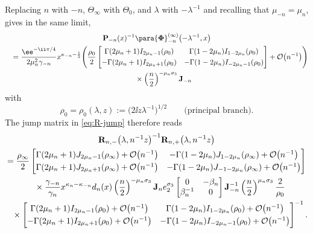 Replacing $n$ with $-n$, $\Theta_\infty$ with $\Theta_0$, and $\lambda$ with $-\lambda^{-1}$ and recalling that $\mu_{-n} = \mu_n$, gives in the same limit,
\begin{gather*}
 \mathbf{P}_{-n}(x)^{-1}\para{\mathbf{\Phi}}_{-n}^{(\infty)}\bigl(-\lambda^{-1},x\bigr)
\\
 \quad =\frac{\ee^{-\ii\pi/4}}{2\mu_n^2\gamma_{-n}}x^{\kappa_{-n}-\frac{1}{2}}\Bigg(\frac{\rho_0}{2}\begin{bmatrix}{\Gamma(2\mu_n+1)}{} I_{2\mu_n-1}(\rho_0) & {\Gamma(1-2\mu_n)}{} I_{1-2\mu_n}(\rho_0) \vspace{1mm}\\
 -{\Gamma(2\mu_n+1)}{}I_{2\mu_n+1}(\rho_0)&-{\Gamma(1-2\mu_n)}{}I_{-2\mu_n-1}(\rho_0)
 \end{bmatrix} +\mathcal{O}\big(n^{-1}\big)\Bigg)\\
\phantom{ \quad =}{} \times \left(\frac{n}{2}\right)^{-\mu_n \sigma_3}
 \mathbf{J}_{-n}
\end{gather*}
with
\begin{equation}
\rho_0=\rho_0(\lambda,z):=\big(2\ii z\lambda^{-1}\big)^{1/2}\qquad\text{(principal branch)}.
\label{eq:rho-zero-branch}
\end{equation}
The jump matrix in \eqref{eq:R-jump} therefore reads
\begin{gather}
 \mathbf{R}_{n,-}\big(\lambda,n^{-1}z\big)^{-1}
 \mathbf{R}_{n,+}\big(\lambda,n^{-1}z\big) \nonumber\\
 = \frac{\rho_\infty}{2}\begin{bmatrix}
 \Gamma(2\mu_n+1) J_{2\mu_n-1}(\rho_\infty)+ \mathcal{O}\big(n^{-1}\big) & -\Gamma(1-2\mu_n) J_{1-2\mu_n}(\rho_\infty)+ \mathcal{O}\big(n^{-1}\big) \vspace{1mm}\\
 \Gamma(2\mu_n+1) J_{2\mu_n+1}(\rho_\infty)+ \mathcal{O}\big(n^{-1}\big) & -\Gamma(1-2\mu_n) J_{-1-2\mu_n}(\rho_\infty)+ \mathcal{O}\big(n^{-1}\big)
 \end{bmatrix}\nonumber\\
\phantom{ =}{} \times{} \frac{\gamma_{-n}}{\gamma_n}x^{\kappa_n-\kappa_{-n}}d_n(x)\left(\frac{n}{2}\right)^{-\mu_n\sigma_3}\mathbf{J}_ne_2^{\sigma_3}\begin{bmatrix}0 & -\beta_n\\\beta_n^{-1} & 0\end{bmatrix}\mathbf{J}_{-n}^{-1}\left(\frac{n}{2}\right)^{\mu_n\sigma_3}\frac{2}{\rho_0}\nonumber
 \\
\phantom{ =}{}\times \begin{bmatrix}{\Gamma(2\mu_n+1)}{} I_{2\mu_n-1}(\rho_0)+ \mathcal{O}\big(n^{-1}\big) & {\Gamma(1-2\mu_n)}{} I_{1-2\mu_n}(\rho_0)+ \mathcal{O}\big(n^{-1}\big) \vspace{1mm}\\
 -{\Gamma(2\mu_n+1)}{}I_{2\mu_n+1}(\rho_0)+ \mathcal{O}\big(n^{-1}\big)&-{\Gamma(1-2\mu_n)}{}I_{-2\mu_n-1}(\rho_0)+ \mathcal{O}\big(n^{-1}\big)
 \end{bmatrix}^{-1}.
 \label{eq:E-hat-jump-1}
\end{gather}
